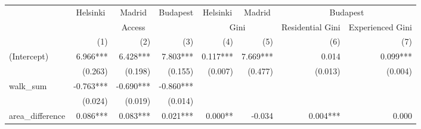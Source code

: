 \begin{tabular}{lrrrrrrr}
\toprule
                      & \multicolumn{1}{c}{Helsinki} & \multicolumn{1}{c}{Madrid} & \multicolumn{1}{c}{Budapest} & \multicolumn{1}{c}{Helsinki} & \multicolumn{1}{c}{Madrid} &                         \multicolumn{2}{c}{Budapest}                        \\ 
\cmidrule(lr){2-2} \cmidrule(lr){3-3} \cmidrule(lr){4-4} \cmidrule(lr){5-5} \cmidrule(lr){6-6} \cmidrule(lr){7-8} 
                      &                                \multicolumn{3}{c}{Access}                                &                  \multicolumn{2}{c}{Gini}                 & \multicolumn{1}{c}{Residential Gini} & \multicolumn{1}{c}{Experienced Gini} \\ 
\cmidrule(lr){2-4} \cmidrule(lr){5-6} \cmidrule(lr){7-7} \cmidrule(lr){8-8} 
                      &                          (1) &                        (2) &                          (3) &                          (4) &                        (5) &                                  (6) &                                  (7) \\ 
\midrule
(Intercept)           &                     6.966*** &                   6.428*** &                     7.803*** &                     0.117*** &                   7.669*** &                                0.014 &                             0.099*** \\ 
                      &                      (0.263) &                    (0.198) &                      (0.155) &                      (0.007) &                    (0.477) &                              (0.013) &                              (0.004) \\ 
walk\_sum             &                    -0.763*** &                  -0.690*** &                    -0.860*** &                              &                            &                                      &                                      \\ 
                      &                      (0.024) &                    (0.019) &                      (0.014) &                              &                            &                                      &                                      \\ 
area\_difference      &                     0.086*** &                   0.083*** &                     0.021*** &                      0.000** &                     -0.034 &                             0.004*** &                                0.000 \\ 

\end{tabular}
